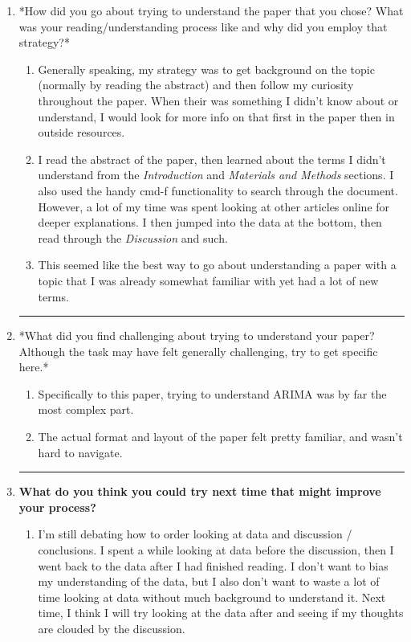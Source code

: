 \documentclass[letterpaper]{article}
\begin{document}
\begin{enumerate}
\item *How did you go about trying to understand the paper that you chose?
What was your reading/understanding process like and why did you
employ that strategy?*

\begin{enumerate}
\item Generally speaking, my strategy was to get background on the topic
(normally by reading the abstract) and then follow my curiosity
throughout the paper. When their was something I didn't know about
or understand, I would look for more info on that first in the
paper then in outside resources.
\item I read the abstract of the paper, then learned about the terms I
didn't understand from the \emph{Introduction} and \emph{Materials and
Methods} sections. I also used the handy cmd-f functionality to
search through the document. However, a lot of my time was spent
looking at other articles online for deeper explanations. I then
jumped into the data at the bottom, then read through the
\emph{Discussion} and such.
\item This seemed like the best way to go about understanding a paper
with a topic that I was already somewhat familiar with yet had a
lot of new terms.
\end{enumerate}

\noindent\rule{\textwidth}{0.5pt}

\item *What did you find challenging about trying to understand your paper?
Although the task may have felt generally challenging, try to get
specific here.*

\begin{enumerate}
\item Specifically to this paper, trying to understand ARIMA was by far
the most complex part.
\item The actual format and layout of the paper felt pretty familiar,
and wasn't hard to navigate.
\end{enumerate}

\noindent\rule{\textwidth}{0.5pt}

\item \textbf{What do you think you could try next time that might improve your
process?}

\begin{enumerate}
\item I'm still debating how to order looking at data and discussion /
conclusions. I spent a while looking at data before the
discussion, then I went back to the data after I had finished
reading. I don't want to bias my understanding of the data, but I
also don't want to waste a lot of time looking at data without
much background to understand it. Next time, I think I will try
looking at the data after and seeing if my thoughts are clouded by
the discussion.
\end{enumerate}
\end{enumerate}
\end{document}
